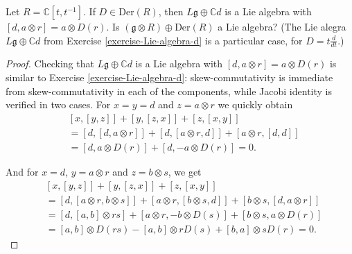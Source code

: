 \begin{exercise}
\label{exercise-for-those-who-like-geometry}
Let $R=\mathbb{C}[t,t^{-1}]$.
If $D \in \text{Der}(R)$, then
$L\mathfrak{g} \oplus \mathbb{C}d$ is a Lie
algebra with
$[d,a \otimes r]=a\otimes D(r)$.
Is $(\mathfrak{g}\otimes R)\oplus
\text{Der}(R)$ a Lie algebra? (The Lie alegra
$L\mathfrak{g} \oplus \mathbb{C}d$ from
Exercise \ref{exercise-Lie-algebra-d} is
a particular case, for $D=t\frac{d}{dt}$.)
\end{exercise}

\begin{proof}
Checking that $L\mathfrak{g} \oplus
\mathbb{C}d$ is a Lie algebra with
$[d,a\otimes r]=a \otimes D(r)$ is similar to
Exercise
\ref{exercise-Lie-algebra-d}:
skew-commutativity is immediate from
skew-commutativity in each of the components,
while
Jacobi identity is verified in two cases. For
$x=y=d$ and $z=a \otimes r$
we quickly obtain
$$
\begin{aligned}
&[x,[y,z]]+[y,[z,x]]+[z,[x,y]]\\
&=[d,[d,a \otimes r]]+[d,[a \otimes r,d]]+[a
\otimes r,[d,d]]\\
&=[d,a \otimes D(r)]+[d,-a \otimes D(r)]=0.
\end{aligned}
$$

And for $x=d$, $y=a \otimes r$ and $z=b
\otimes s$, we get
\begin{equation}
\label{equation-Jacobi-derivation}
\begin{aligned}
&[x,[y,z]]+[y,[z,x]]+[z,[x,y]]\\
&=[d,[a\otimes r,b \otimes s]]+[a\otimes r,[b
\otimes s,d]]
+[b \otimes s,[d,a\otimes r]]\\
&=[d,[a,b]\otimes rs]+[a\otimes r,-b\otimes
D(s)]
+[b\otimes s,a\otimes D(r)]\\
&=[a,b]\otimes D(rs)-[a,b]\otimes
rD(s)+[b,a]\otimes sD(r)=0.
\end{aligned}
\end{equation}


\end{proof}
